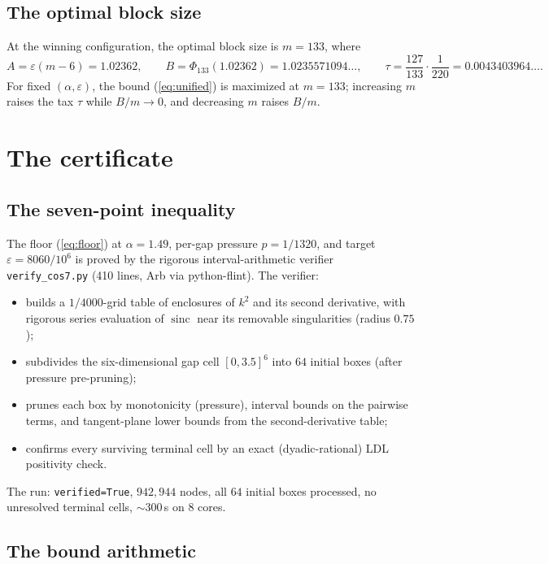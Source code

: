 \documentclass[11pt]{article}
\newcommand{\sinc}{\operatorname{sinc}}
\newcommand{\eps}{\varepsilon}
\begin{document}
\subsection{The optimal block size}
\label{sec:m}

At the winning configuration, the optimal block size is $m=133$, where
\[
 A = \eps(m-6) = 1.02362,\qquad
 B = \Phi_{133}(1.02362) = 1.0235571094\ldots,\qquad
 \tau = \frac{127}{133}\cdot\frac{1}{220} = 0.0043403964\ldots .
\]
For fixed $(\alpha,\eps)$, the bound (\ref{eq:unified}) is maximized at
$m=133$; increasing $m$ raises the tax $\tau$ while $B/m\to0$, and decreasing
$m$ raises $B/m$.

\section{The certificate}
\label{sec:cert}

\subsection{The seven-point inequality}
\label{sec:seven}

The floor (\ref{eq:floor}) at $\alpha=1.49$, per-gap pressure $p=1/1320$, and
target $\eps = 8060/10^6$ is proved by the rigorous interval-arithmetic
verifier \texttt{verify\_cos7.py} (410 lines, Arb via python-flint).  The
verifier:
\begin{itemize}
\item builds a $1/4000$-grid table of enclosures of $k^2$ and its second
  derivative, with rigorous series evaluation of $\sinc$ near its removable
  singularities (radius $0.75$);
\item subdivides the six-dimensional gap cell $[0,3.5]^6$ into $64$ initial
  boxes (after pressure pre-pruning);
\item prunes each box by monotonicity (pressure), interval bounds on the
  pairwise terms, and tangent-plane lower bounds from the second-derivative
  table;
\item confirms every surviving terminal cell by an exact
  (dyadic-rational) LDL positivity check.
\end{itemize}
The run: \texttt{verified=True}, $942{,}944$ nodes, all $64$ initial boxes
processed, no unresolved terminal cells, $\sim300$\,s on 8 cores.

\subsection{The bound arithmetic}
\label{sec:arith}
\end{document}
